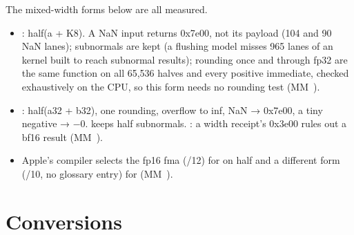 The mixed-width forms below are all measured.

\begin{itemize}
\item {}: half(a + K8). A NaN input returns 0x7e00, not its payload (104 and 90 NaN lanes);
  subnormals are kept (a flushing model misses 965 lanes of an  kernel built to reach subnormal results);
  rounding once and through fp32 are the same function on all 65,536 halves and every positive immediate, checked
  exhaustively on the CPU, so this form needs no rounding test (MM~).
\item {}: half(a32 + b32), one rounding, overflow to inf, NaN → 0x7e00, a tiny negative → −0.
   keeps half subnormals. : a width receipt's
  0x3e00 rules out a bf16 result (MM~).
\item Apple's compiler selects the fp16 fma (/12) for  on half and a different form (/10, no glossary entry) for 
  (MM~).
\end{itemize}

\section{Conversions}\label{sec:conversions}

